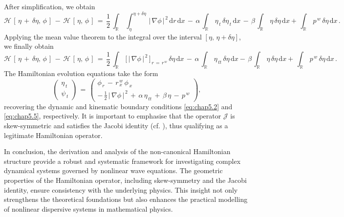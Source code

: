 \documentclass[alpha-refs, 12pt]{wiley-article}
\begin{document}
After simplification, we obtain
\begin{equation*}
  \mathcal{H}\,[\,\eta\,+\,\delta\eta,\,\phi\,]\,-\,\mathcal{H}\,[\,\eta,\,\phi\,]
  \,=\,\frac{1}{2}\,\int_{\mathbb{R}}\,\int_{\eta}^{\eta+\delta\eta}\,|\,\nabla\phi\,|^{\,2}\,\mathrm{d}r\,\mathrm{d}x\,-\,\alpha\,\int_{\mathbb{R}}\,\eta_{\,t}\,\delta\eta_{\,t}\,\mathrm{d}x\,-\,\beta\,\int_{\mathbb{R}}\,\eta\,\delta\eta\,\mathrm{d}x
  +\,\int_{\mathbb{R}}\,p^{\,w}\,\delta\eta\,\mathrm{d}x\,.
\end{equation*}
Applying the mean value theorem to the integral over the interval $[\eta,\,\eta+\delta\eta]$, we finally obtain
\begin{equation*}
  \mathcal{H}\,[\,\eta\,+\,\delta\eta,\,\phi\,]\,-\,\mathcal{H}\,[\,\eta,\,\phi\,]
  \,=\,\frac{1}{2}\,\int_{\mathbb{R}}\,\bigl[\,|\,\nabla\phi\,|^{\,2}\,\bigr]_{\,r\,=\,r^{\,w}}\,\delta\eta\,\mathrm{d}x\,-\,\alpha\,\int_{\mathbb{R}}\,\eta_{\,tt}\,\delta\eta\,\mathrm{d}x
  -\,\beta\,\int_{\mathbb{R}}\,\eta\,\delta\eta\,\mathrm{d}x
  +\,\int_{\mathbb{R}}\,p^{\,w}\,\delta\eta\,\mathrm{d}x\,.
\end{equation*}
The Hamiltonian evolution equations take the form
\begin{equation}
  \begin{pmatrix}
    \eta_{\,t} \\
    \psi_{\,t}
  \end{pmatrix}
  \,=\,\begin{pmatrix}
    \phi_{\,r}\,-\,r^{\,w}_{\,x}\,\phi_{\,x} \\
    -\,\frac{1}{2}\,|\,\nabla\phi\,|^{\,2}\,+\,\alpha\,\eta_{\,tt}\,+\,\beta\,\eta\,-\,p^{\,w}
  \end{pmatrix},
\end{equation}
recovering the dynamic and kinematic boundary conditions \eqref{eq:chap5.2} and \eqref{eq:chap5.5}, respectively. It is important to emphasise that the operator $\mathcal{J}$ is skew-symmetric and satisfies the Jacobi identity (cf. \citet{Nutku1987}), thus qualifying as a legitimate Hamiltonian operator.

In conclusion, the derivation and analysis of the non-canonical Hamiltonian structure provide a robust and systematic framework for investigating complex dynamical systems governed by nonlinear wave equations. The geometric properties of the Hamiltonian operator, including skew-symmetry and the Jacobi identity, ensure consistency with the underlying physics. This insight not only strengthens the theoretical foundations but also enhances the practical modelling of nonlinear dispersive systems in mathematical physics.
\end{document}
